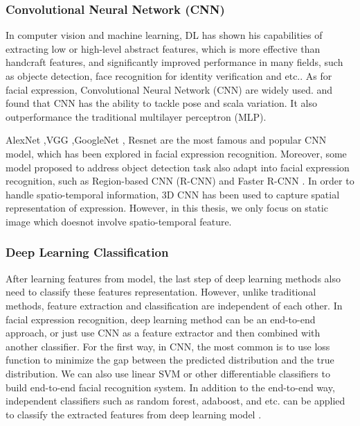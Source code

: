 \subsubsection{Convolutional Neural Network (CNN)}
In computer vision and machine learning, DL has shown his capabilities of extracting low or high-level abstract features, which is more effective than handcraft features, and significantly improved performance in many fields, such as objecte detection, face recognition for identity verification and etc.. As for facial expression, Convolutional Neural Network (CNN) are widely used. \citeauthor{fasel2002robust} and \citeauthor{1167051} found that CNN has the ability to tackle pose and scala variation. It also outperformance the traditional multilayer perceptron (MLP).

AlexNet \citep{krizhevsky2017imagenet},VGG \citep{simonyan2014very},GoogleNet \citep{szegedy2015going}, Resnet \citep{he2016deep} are the most famous and popular CNN model, which has been explored in facial expression recognition. Moreover, some model proposed to address object detection task also adapt into facial expression recognition, such as Region-based CNN (R-CNN)\citep{girshick2013rich} and Faster R-CNN \citep{li2017facial}. In order to handle spatio-temporal information, 3D CNN \citep*{ji20123d,tran2014learning} has been used to capture spatial representation of expression. However, in this thesis, we only focus on static image which doesnot involve spatio-temporal feature.

\subsubsection{Deep Learning Classification}
After learning features from model, the last step of deep learning methods also need to classify these features representation. However, unlike traditional methods, feature extraction and classification are independent of each other. In facial expression recognition, 
deep learning method can be an end-to-end approach, or just use CNN as a feature extractor and then combined with another classifier. For the first way, in CNN, the most common is to use loss function to minimize the gap between the predicted distribution and the true distribution. We can also use linear SVM \citep{tang2013deep} or other differentiable classifiers to build end-to-end facial recognition system. In addition to the end-to-end way, independent classifiers such as random forest, adaboost, and etc. can be applied to classify the extracted features from deep learning model \citep{donahue2013decaf}.



